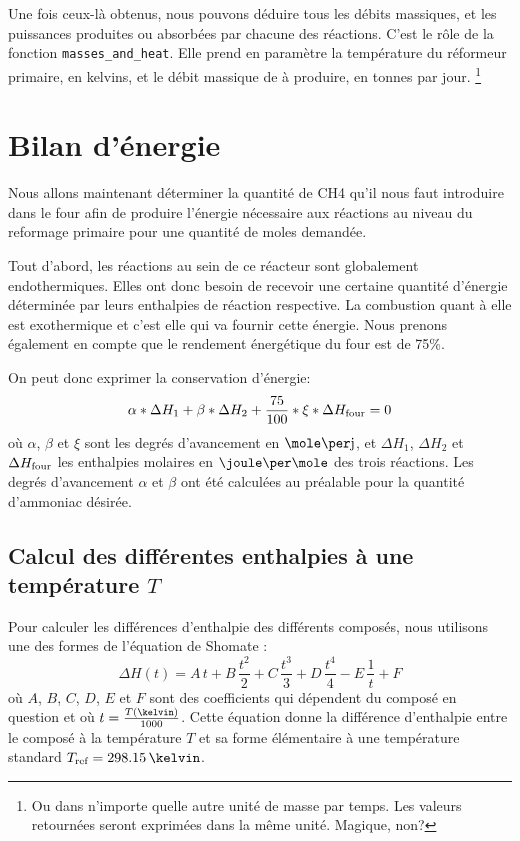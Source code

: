 \documentclass[a4paper,12pt]{article}
\begin{document}
Une fois ceux-là obtenus, nous pouvons déduire tous
les débits massiques,
et les puissances produites ou absorbées par chacune des réactions.
C'est le rôle de la fonction \texttt{masses\_and\_heat}.
Elle prend en paramètre la température du réformeur primaire, en kelvins,
et le débit massique de  à produire, en tonnes par jour.%
\footnote{Ou dans n'importe quelle autre unité de masse par temps.
Les valeurs retournées seront exprimées dans la même unité. Magique, non?}

\section{Bilan d'énergie}

Nous allons maintenant déterminer la quantité de CH4 qu’il nous faut introduire
dans le four afin de produire l’énergie nécessaire aux réactions
au niveau du reformage primaire pour une quantité de moles demandée.

Tout d’abord, les réactions au sein de ce réacteur sont globalement endothermiques.
Elles ont donc besoin de recevoir une certaine quantité d’énergie
déterminée par leurs enthalpies de réaction respective.
La combustion quant à elle est exothermique et c’est elle qui va fournir cette énergie.
Nous prenons également en compte que le rendement énergétique du four est de 75\%.

On peut donc exprimer la conservation d'énergie:
$$\alpha*\Delta H_1 + \beta*\Delta H_2 + \frac{75}{100}*\xi*\Delta H_{\mbox{\scriptsize{four}}} = 0$$
où $\alpha$, $\beta$ et $\xi$ sont les degrés d'avancement en $\mole\per\jour$,
et $\Delta H_1$, $\Delta H_2$ et $\Delta H_{\mbox{\scriptsize{four}}}$ les enthalpies molaires en
$\joule\per\mole$ des trois réactions.
Les degrés d'avancement $\alpha$ et $\beta$ ont été calculées
au préalable pour la quantité d’ammoniac désirée.

\subsection{Calcul des différentes enthalpies à une température $T$}

Pour calculer les différences d'enthalpie des différents composés,
nous utilisons une des formes de l'équation de Shomate \cite{nist}:
$$\Delta H(t) = A\,t + B\,\frac{t^2}{2} + C\,\frac{t^3}{3}
+ D\,\frac{t^4}{4} - E\,\frac{1}{t} + F$$
où $A$, $B$, $C$, $D$, $E$ et $F$ sont des coefficients
qui dépendent du composé en question et où $t=\frac{T(\kelvin)}{1000}$.
Cette équation donne la différence d'enthalpie entre le composé à la température $T$
et sa forme élémentaire à une température standard $T\ind{ref} = 298.15\,\kelvin$.
\end{document}
